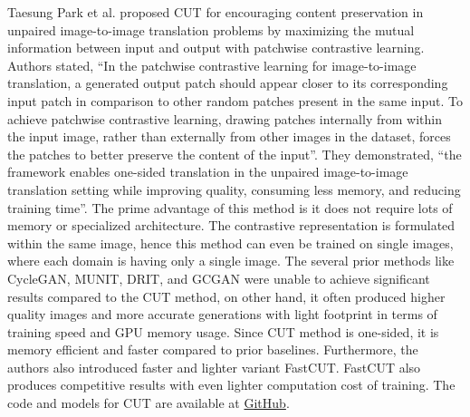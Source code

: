 Taesung Park et al.\cite{park2020contrastive} proposed \ac{CUT} for encouraging content preservation in unpaired image-to-image translation problems by maximizing the mutual information between input and output with patchwise contrastive learning\cite{oord2019representation}. Authors stated, ``In the patchwise contrastive learning for image-to-image translation, a generated output patch should appear closer to its corresponding input patch in comparison to other random patches present in the same input. To achieve patchwise contrastive learning, drawing patches internally from within the input image, rather than externally from other images in the dataset, forces the patches to better preserve the content of the input''\cite{park2020contrastive}. They demonstrated, ``the framework enables one-sided translation in the unpaired image-to-image translation setting while improving quality, consuming less memory, and reducing training time''\cite{park2020contrastive}. The prime advantage of this method is it does not require lots of memory\cite{8578491}\cite{he2020momentum} or specialized architecture\cite{henaff2020dataefficient}\cite{bachman2019learning}. The contrastive representation is formulated within the same image, hence this method can even be trained on single images, where each domain is having only a single image\cite{park2020contrastive}. The several prior methods like \ac{CycleGAN}\cite{zhu2020unpaired}, \ac{MUNIT}\cite{liu2018unsupervised}, \ac{DRIT}\cite{lee2019drit}, and \ac{GCGAN}\cite{fu2018geometryconsistent} were unable to achieve significant results compared to the \ac{CUT} method, on other hand, it often produced higher quality images and more accurate generations with light footprint in terms of training speed and GPU memory usage. Since \ac{CUT} method is one-sided, it is memory efficient and faster compared to prior baselines. Furthermore, the authors also introduced faster and lighter variant \ac{FastCUT}. \ac{FastCUT} also produces competitive results with even lighter computation cost of training. The code and models for \ac{CUT} are available at \href{https://github.com/taesungp/contrastive-unpaired-translation}{GitHub}.


